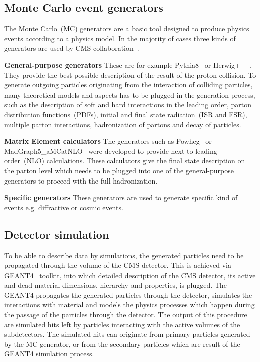 \subsection{Monte Carlo event generators}

The Monte Carlo~(MC) generators are a basic tool designed to produce physics events according to a physics model. In the majority of cases three kinds of generators are used by CMS collaboration~\cite{website:generation, website:generationIntro}. 

\textbf{General-purpose generators}
These are for example Pythia8~\cite{Sjostrand:2014zea} or Herwig++~\cite{Bahr:2008pv}. They provide the best possible description of the result of the proton collision. To generate outgoing particles originating from the interaction of colliding particles, many theoretical models and aspects has to be plugged in the generation process, such as the description of soft and hard interactions in the leading order, parton distribution functions~(PDFs), initial and final state radiation~(ISR and FSR), multiple parton interactions, hadronization of partons and decay of particles.

\textbf{Matrix Element calculators}
The generators such as Powheg~\cite{Oleari:2010nx} or MadGraph5\_aMCatNLO~\cite{Alwall:2014hca} were developed to provide next-to-leading order~(NLO) calculations. These calculators give the final state description on the parton level which needs to be plugged into one of the general-purpose generators to proceed with the full hadronization.

\textbf{Specific generators}
These generators are used to generate specific kind of events e.g. diffractive or cosmic events.

\subsection{Detector simulation}

To be able to describe data by simulations, the generated particles need to be propagated through the volume of the CMS detector. This is achieved via GEANT4~\cite{Agostinelli:2002hh, Lefebure:1999wja} toolkit, into which detailed description of the CMS detector, its active and dead material dimensions, hierarchy and properties, is plugged. The GEANT4 propagates the generated particles through the detector, simulates the interactions with material and models the physics processes which happen during the passage of the particles through the detector. The output of this procedure are simulated hits left by particles interacting with the active volumes of the subdetectors. The simulated hits can originate from primary particles generated by the MC generator, or from the secondary particles which are result of the GEANT4 simulation process.

